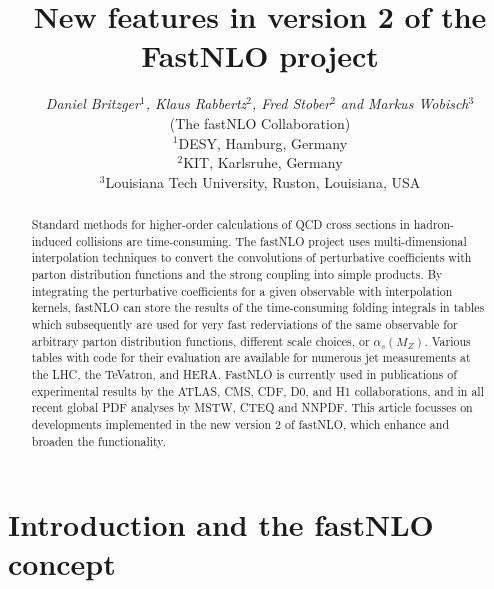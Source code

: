 \documentclass{DISproc}
\begin{document}
\title{New features in version 2 of the FastNLO project}

\author{{\slshape Daniel Britzger$^1$, Klaus Rabbertz$^2$, Fred Stober$^2$ and Markus Wobisch$^3$}\\
(The fastNLO Collaboration)\\[1ex]
$^1$DESY, Hamburg, Germany\\
$^2$KIT, Karlsruhe, Germany\\
$^3$Louisiana Tech University, Ruston, Louisiana, USA}



\doi  %

\maketitle

\begin{abstract}
  Standard methods for higher-order calculations of QCD cross sections in hadron-induced collisions are time-consuming. The fastNLO project uses multi-dimensional interpolation techniques to convert the convolutions of perturbative coefficients with parton distribution functions and the strong coupling into simple products.
  By integrating the perturbative coefficients for a given observable with interpolation kernels, fastNLO can store the results of the time-consuming folding integrals in tables which subsequently are used for very fast rederviations of the same observable for arbitrary parton distribution functions, different scale choices, or $\alpha_s(M_Z)$.
  Various tables with code for their evaluation are available for numerous jet measurements at the LHC, the TeVatron, and HERA. FastNLO is currently used in publications of experimental results by the ATLAS, CMS, CDF, D0, and H1 collaborations, and in all recent global PDF analyses by MSTW, CTEQ and NNPDF.
  This article focusses on developments implemented in the new version 2 of fastNLO, which enhance and broaden the functionality.
\end{abstract}



\section{Introduction and the fastNLO concept}
\end{document}
